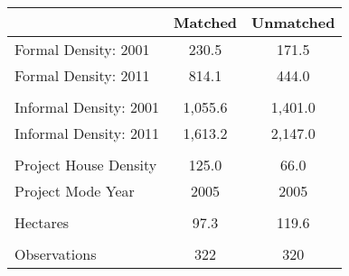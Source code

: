 \begin{tabu}{lcc}
 & Matched       & Unmatched     \\
\midrule
 Formal Density: 2001  & 230.5  & 171.5  \\ 
 Formal Density: 2011  & 814.1  & 444.0  \\ 
 &  &  \\ 
 Informal Density: 2001  & 1,055.6  & 1,401.0  \\ 
 Informal Density: 2011  & 1,613.2  & 2,147.0  \\ 
 &  &  \\ 
 Project House Density  & 125.0  & 66.0  \\ 
 Project Mode Year  & 2005  & 2005  \\ 
 &  &  \\ 
 Hectares  & 97.3  & 119.6  \\ 
 &  &  \\ 
\midrule
 Observations  & 322  & 320  \\ 
\bottomrule
\end{tabu}
